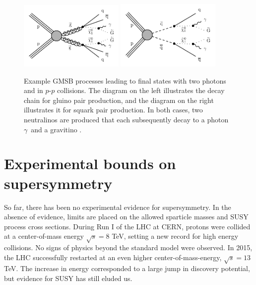 \begin{figure}[htbp]
    \centering
    \includegraphics[width=0.45\textwidth]{Figures/Results/gluinoDecay.pdf}
    \includegraphics[width=0.45\textwidth]{Figures/Results/squarkDecay.pdf}
    \caption[Example GMSB processes leading to final states with two photons 
   	 and \ETmiss in $p$-$p$ collisions.]
	 {Example GMSB processes leading to final states with two photons 
   	 and \ETmiss in $p$-$p$ collisions.
        The diagram on the left illustrates the decay chain for gluino pair production, and 
        the diagram on the right illustrates it for squark pair production. In both cases, 
        two neutralinos \neutralino are produced that each subsequently decay to a photon $\gamma$~and a gravitino \gravitino.
        }
    \label{fig:gluinoSquarkDecay1}
\end{figure}

\section{Experimental bounds on supersymmetry}
\label{sec:SUSYlimits}

So far, there has been no experimental evidence for supersymmetry. In the absence of evidence, limits
are placed on the allowed sparticle masses and SUSY process cross sections. 
During Run I of the LHC at CERN,
protons were collided at a center-of-mass energy $\sqrt{s} = 8$ TeV, setting a new record for high energy
collisions. No signs of physics beyond the standard model were observed. In 2015, the LHC successfully 
restarted at an even higher center-of-mass-energy, $\sqrt{s} = 13$ TeV. The increase in energy corresponded
to a large jump in discovery potential, but evidence for SUSY has still eluded us. 

